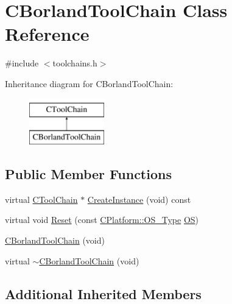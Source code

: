 \hypertarget{classCBorlandToolChain}{\section{C\-Borland\-Tool\-Chain Class Reference}
\label{classCBorlandToolChain}
}


{\ttfamily \#include $<$toolchains.\-h$>$}

Inheritance diagram for C\-Borland\-Tool\-Chain\-:\begin{figure}[H]
\begin{center}
\leavevmode
\includegraphics[height=2.000000cm]{d8/d8b/classCBorlandToolChain}
\end{center}
\end{figure}
\subsection*{Public Member Functions}
\begin{DoxyCompactItemize}
\item 
virtual \hyperlink{classCToolChain}{C\-Tool\-Chain} $\ast$ \hyperlink{classCBorlandToolChain_ae761316ad1cd0f7a4f8cdc6fa33163b0}{Create\-Instance} (void) const 
\item 
virtual void \hyperlink{classCBorlandToolChain_a25c0228c4c57d8abf968e0fb32031a55}{Reset} (const \hyperlink{classCPlatform_a2fb735c63c53052f79629e338bb0f535}{C\-Platform\-::\-O\-S\-\_\-\-Type} \hyperlink{classCToolChain_abe4054d9081351e099163e2c53b260f8}{O\-S})
\item 
\hyperlink{classCBorlandToolChain_a40792f9ab0c1042088a2aa00006b6c94}{C\-Borland\-Tool\-Chain} (void)
\item 
virtual \hyperlink{classCBorlandToolChain_ac14475f9a7aa01427c465acfa6efab25}{$\sim$\-C\-Borland\-Tool\-Chain} (void)
\end{DoxyCompactItemize}
\subsection*{Additional Inherited Members}


